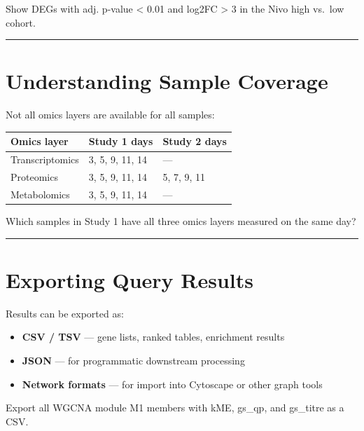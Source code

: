 \documentclass[
  letterpaper,
  oneside,
  open=any]{scrbook}
\newcounter{none} %
\providecommand{\tightlist}{%
  \setlength{\itemsep}{0pt}\setlength{\parskip}{0pt}}
\begin{document}
Show DEGs with adj. p-value \textless{} 0.01 and
\textbar log2FC\textbar{} \textgreater{} 3 in the Nivo high vs.~low
cohort.

\begin{center}\rule{0.5\linewidth}{0.5pt}\end{center}

\section{Understanding Sample
Coverage}\label{understanding-sample-coverage}

Not all omics layers are available for all samples:

{\def\LTcaptype{none} %
\begin{longtable}[]{@{}lll@{}}
\toprule\noalign{}
Omics layer & Study 1 days & Study 2 days \\
\midrule\noalign{}
\endhead
\bottomrule\noalign{}
\endlastfoot
Transcriptomics & 3, 5, 9, 11, 14 & --- \\
Proteomics & 3, 5, 9, 11, 14 & 5, 7, 9, 11 \\
Metabolomics & 3, 5, 9, 11, 14 & --- \\
\end{longtable}
}

Which samples in Study 1 have all three omics layers measured on the
same day?

\begin{center}\rule{0.5\linewidth}{0.5pt}\end{center}

\section{Exporting Query Results}\label{exporting-query-results}

Results can be exported as:

\begin{itemize}
\tightlist
\item
  \textbf{CSV / TSV} --- gene lists, ranked tables, enrichment results
\item
  \textbf{JSON} --- for programmatic downstream processing
\item
  \textbf{Network formats} --- for import into Cytoscape or other graph
  tools
\end{itemize}

Export all WGCNA module M1 members with kME, gs\_qp, and gs\_titre as a
CSV.
\end{document}
